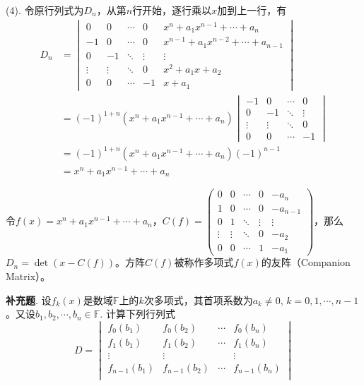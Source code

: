 (4). 令原行列式为$D_n$，从第$n$行开始，逐行乘以$x$加到上一行，有
\begin{align*}
D_n & = \begin{vmatrix} 0 & 0 & \cdots & 0 & x^n+a_1x^{n-1}+\cdots+a_n \\ -1 & 0 & \cdots & 0 & x^{n-1}+a_1x^{n-2}+\cdots+a_{n-1} \\ 0 & -1 & \ddots & \vdots & \vdots \\ \vdots & \vdots & \ddots & 0 & x^2+a_1x+a_2 \\ 0 & 0 & \cdots & -1 & x+a_1 \end{vmatrix} \\
& = (-1)^{1+n}(x^n+a_1x^{n-1}+\cdots+a_n) \begin{vmatrix} -1 & 0 & \cdots & 0 \\ 0 & -1 & \ddots & \vdots \\ \vdots & \vdots & \ddots & 0 \\ 0 & 0 & \cdots & -1 \end{vmatrix} \\
& = (-1)^{1+n}(x^n+a_1x^{n-1}+\cdots+a_n) (-1)^{n-1} \\
& = x^n+a_1x^{n-1}+\cdots+a_n
\end{align*}

令$f(x) = x^n+a_1x^{n-1}+\cdots+a_n$，$C(f) = \begin{pmatrix} 0 & 0 & \cdots & 0 & -a_n \\ 1 & 0 & \cdots & 0 & -a_{n-1} \\ 0 & 1 & \ddots & \vdots & \vdots \\ \vdots & \vdots & \ddots & 0 & -a_2 \\ 0 & 0 & \cdots & 1 & -a_1 \end{pmatrix}$，那么$D_n = \det (x - C(f))$。方阵$C(f)$被称作多项式$f(x)$的友阵（Companion Matrix）。

\newpageorvspace

{\bf 补充题}. 设$f_k(x)$是数域$\mathbb{F}$上的$k$次多项式，其首项系数为$a_k \neq 0$, $k = 0,1,\cdots,n-1$。又设$b_1,b_2,\cdots,b_n\in\mathbb{F}$. 计算下列行列式
$$D = \begin{vmatrix}
f_0(b_1) & f_0(b_2) & \cdots & f_0(b_n) \\
f_1(b_1) & f_1(b_2) & \cdots & f_1(b_n) \\
\vdots & \vdots & & \vdots \\
f_{n-1}(b_1) & f_{n-1}(b_2) & \cdots & f_{n-1}(b_n) \\
\end{vmatrix}$$

